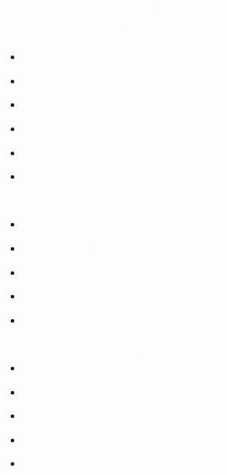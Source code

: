 
\titlebackground
\thankyouframe


\introbackground
\begin{frame}
    \centering
    \Large

    \textcolor{white}{\LARGE{\textbf{Vote sur le prochain PPPPP}}}\\
    \vspace{24pt}

     {
        \textcolor{white}{
        \LARGE{\textbf{Deep-Dive sur les composantes Passives}}}\\

        \begin{itemize}
            \item \textcolor{white}{Types de condensateurs}
            \item \textcolor{white}{Derating de condensateurs}
            \item \textcolor{white}{Courbes d'impédance}
            \item \textcolor{white}{Saturation de bobines}
            \item \textcolor{white}{Normes et spécifications}
            \item \textcolor{white}{Comment choisir une composante}
        \end{itemize}
    }
     {
        \textcolor{white}{
        \LARGE{\textbf{Bonnes pratiques de Schéma \& Layout}}}\\

        \begin{itemize}
            \item \textcolor{white}{Quoi mettre sur un silkscreen}
            \item \textcolor{white}{Notes sur un schéma}
            \item \textcolor{white}{Protections de circuit}
            \item \textcolor{white}{Comment utiliser les couches mécaniques}
            \item \textcolor{white}{Comment bien faire un BOM}
        \end{itemize}
    }
     {
        \textcolor{white}{
        \LARGE{\textbf{Comment se déplace un signal sur un PCB}}}\\

        \begin{itemize}
            \item \textcolor{white}{Où l'impédance est la plus faible?}
            \item \textcolor{white}{Retour de courant}
            \item \textcolor{white}{Ground Bounce}
            \item \textcolor{white}{Vitesse de déplacement d'un signal}
            \item \textcolor{white}{Tout est une ligne de transmission}
        \end{itemize}
    }


\end{frame}
